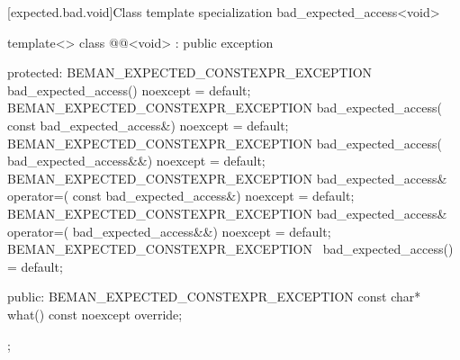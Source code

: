 [expected.bad.void]{Class template specialization bad_expected_access<void>}

\begin{codeblock}
template<>
class @@<void> : public exception {
protected:
  BEMAN_EXPECTED_CONSTEXPR_EXCEPTION bad_expected_access() noexcept = default;
  BEMAN_EXPECTED_CONSTEXPR_EXCEPTION bad_expected_access(
      const bad_expected_access&) noexcept = default;
  BEMAN_EXPECTED_CONSTEXPR_EXCEPTION bad_expected_access(
      bad_expected_access&&) noexcept = default;
  BEMAN_EXPECTED_CONSTEXPR_EXCEPTION bad_expected_access& operator=(
      const bad_expected_access&) noexcept = default;
  BEMAN_EXPECTED_CONSTEXPR_EXCEPTION bad_expected_access& operator=(
      bad_expected_access&&) noexcept = default;
  BEMAN_EXPECTED_CONSTEXPR_EXCEPTION ~bad_expected_access() = default;

public:
  BEMAN_EXPECTED_CONSTEXPR_EXCEPTION const char* what() const noexcept override;
};
\end{codeblock}
